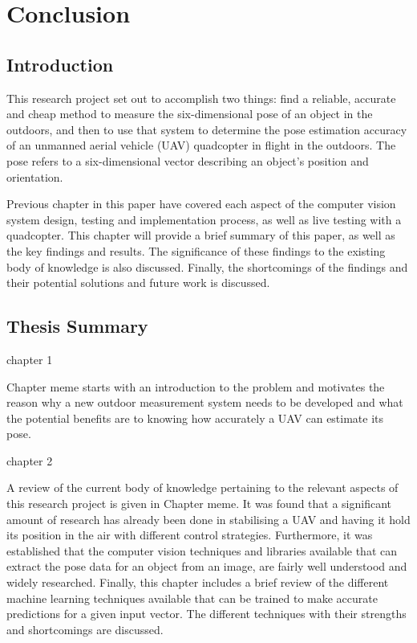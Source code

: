\chapter{Conclusion}

\section{Introduction}

This research project set out to accomplish two things: find a reliable, accurate and cheap method to measure the six-dimensional pose of an object in the outdoors, and then to use that system to determine the pose estimation accuracy of an unmanned aerial vehicle (UAV) quadcopter in flight in the outdoors. The pose refers to a six-dimensional vector describing an object's position and orientation. 

Previous chapter in this paper have covered each aspect of the computer vision system design, testing and implementation process, as well as live testing with a quadcopter. This chapter will provide a brief summary of this paper, as well as the key findings and results. The significance of these findings to the existing body of knowledge is also discussed. Finally, the shortcomings of the findings and their potential solutions and future work is discussed. 

\section{Thesis Summary}

chapter 1 

Chapter meme starts with an introduction to the problem and motivates the reason why a new outdoor measurement system needs to be developed and what the potential benefits are to knowing how accurately a UAV can estimate its pose.  

chapter 2

A review of the current body of knowledge pertaining to the relevant aspects of this research project is given in Chapter meme. It was found that a significant amount of research has already been done in stabilising a UAV and having it hold its position in the air with different control strategies. Furthermore, it was established that the computer vision techniques and libraries available that can extract the pose data for an object from an image, are fairly well understood and widely researched. Finally, this chapter includes a brief review of the different machine learning techniques available that can be trained to make accurate predictions for a given input vector. The different techniques with their strengths and shortcomings are discussed.  


